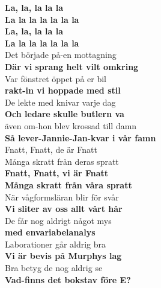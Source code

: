 \documentclass[a6paper, 10pt, twoside]{article}
\begin{document}
\begin{center}
\end{center}
\begin{lyrics}
\textbf{La, la, la la la\\
La la la la la la la\\
La, la, la la la\\
La la la la la la la}
\vspace{5pt}\\
Det började på-en mottagning\\
\textbf{Där vi sprang helt vilt omkring}
\vspace{5pt}\\
Var fönstret öppet på er bil\\
\textbf{rakt-in vi hoppade med stil}
\vspace{5pt}\\
De lekte med knivar varje dag\\
\textbf{Och ledare skulle butlern va}
\vspace{5pt}\\
även om-hon blev krossad till damn\\
\textbf{Så lever-Jannie-Jan-kvar i vår famn}
\vspace{5pt}\\
Fnatt, Fnatt, de är Fnatt\\
Många skratt från deras spratt\\
\textbf{Fnatt, Fnatt, vi är Fnatt}\\
\textbf{Många skratt från våra spratt}
\vspace{5pt}\\
När vågformsläran blir för svår\\
\textbf{Vi sliter av oss allt vårt hår}
\vspace{5pt}\\
De får nog aldrigt något mys\\
\textbf{med envariabelanalys}
\vspace{5pt}\\
Laborationer går aldrig bra\\
\textbf{Vi är bevis på Murphys lag}
\vspace{5pt}\\
Bra betyg de nog aldrig se\\
\textbf{Vad-finns det bokstav före E?}
\vspace{5pt}\\

\end{lyrics}
\end{document}
